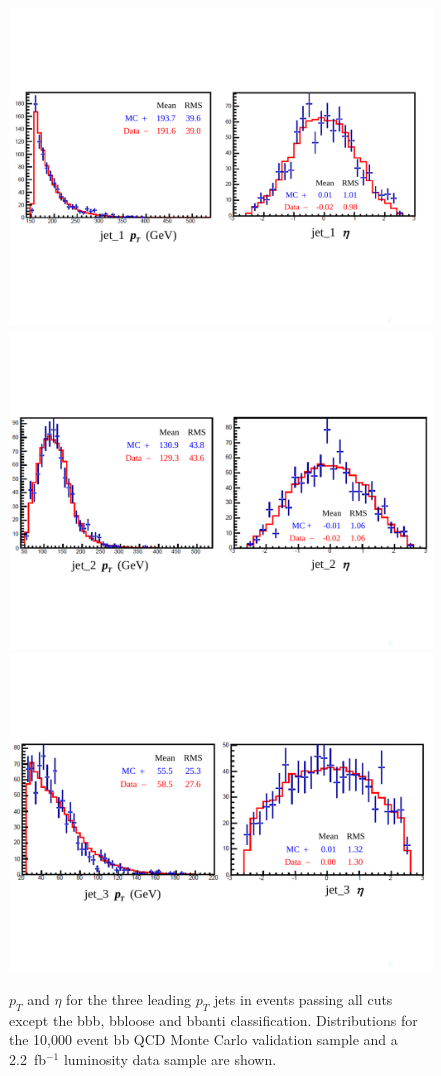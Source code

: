 \begin{figure}
  \includegraphics[width=0.85\linewidth]{MonteCarlo/figures/pt_eta_jet1_bbqcd_vs_data.pdf}
  \includegraphics[width=0.85\linewidth]{MonteCarlo/figures/pt_eta_jet2_bbqcd_vs_data.pdf}
  \includegraphics[width=0.85\linewidth]{MonteCarlo/figures/pt_eta_jet3_bbqcd_vs_data.pdf}
  \caption{$p_T$ and $\eta$ for the three leading $p_T$ jets in events passing all cuts except the
bbb, bbloose and bbanti classification.     Distributions for the 10,000 event bb QCD Monte Carlo validation sample                 
and a 2.2~fb$^{-1}$ luminosity data sample are shown.    \label{fig:pt_eta_bbqcd_vs_data}}                                          
\end{figure}                                                                                                                        
